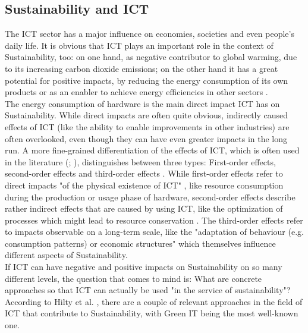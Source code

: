 \documentclass[oribibl]{llncs}
\begin{document}
\subsection{Sustainability and ICT}
The ICT sector has a major influence on economies, societies and even people's daily life. It is obvious that ICT plays an important role in the context of Sustainability, too: on one hand, as negative contributor to global warming, due to its increasing carbon dioxide emissions; on the other hand it has a great potential for positive impacts, by reducing the energy consumption of its own products or as an enabler to achieve energy efficiencies in other sectors \cite{smart2020}.\\
The energy consumption of hardware is the main direct impact ICT has on Sustainability. While direct impacts are often quite obvious, indirectly caused effects of ICT (like the ability to enable improvements in other industries) are often overlooked, even though they can have even greater impacts in the long run. A more fine-grained differentiation of the effects of ICT, which is often used in the literature (\cite{hilty_relevance_2006}; \cite{naumann_greensoft_2011}), distinguishes between three types: First-order effects, second-order effects and third-order effects \cite{berkhout_impacts_2001}. While first-order effects refer to direct impacts "of the physical existence of ICT" \cite[p.\,2]{hilty_relevance_2006}, like resource consumption during the production or usage phase of hardware, second-order effects describe rather indirect effects that are caused by using ICT, like the optimization of processes which might lead to resource conservation \cite{naumann_greensoft_2011}. The third-order effects refer to impacts observable on a long-term scale, like the "adaptation of behaviour (e.g. consumption patterns) or economic structures" \cite[p.\,2]{hilty_relevance_2006} which themselves influence different aspects of Sustainability.\\  
If ICT can have negative and positive impacts on Sustainability on so many different levels, the question that comes to mind is: What are concrete approaches so that ICT can actually be used "in the service of sustainability"\cite[p.\,5]{hilty11}? According to Hilty et al. \cite{hilty11}, there are a couple of relevant approaches in the field of ICT that contribute to Sustainability, with Green IT being the most well-known one.
\end{document}
